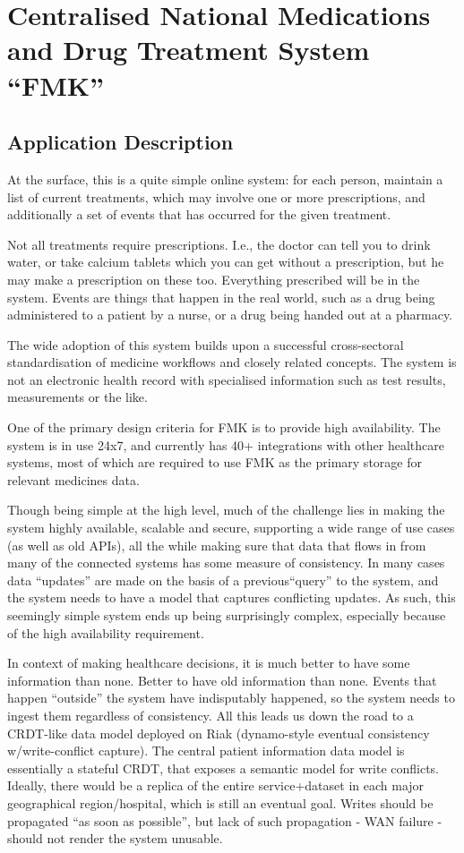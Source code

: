 \documentclass[11pt,a4paper]{report}
\begin{document}
\section{Centralised National Medications and Drug Treatment System ``FMK''}
\subsection{Application Description}
At the surface, this is a quite simple online system: for each person, maintain a list of current treatments, which may involve one or more prescriptions, and additionally a set of events that has occurred for the given treatment. 

Not all treatments require prescriptions. I.e., the doctor can tell you to drink water, or take calcium tablets which you can get without a prescription, but he may make a prescription on these too. Everything prescribed will be in the system. Events are things that happen in the real world, such as a drug being administered to a patient by a nurse, or a drug being handed out at a pharmacy. 

The wide adoption of this system builds upon a successful cross-sectoral standardisation of medicine workflows and closely related concepts. The system is not an electronic health record with specialised information such as test results, measurements or the like.

One of the primary design criteria for FMK is to provide high availability. The system is in use 24x7, and currently has 40+ integrations with other healthcare systems, most of which are required to use FMK as the primary storage for relevant medicines data.

Though being simple at the high level, much of the challenge lies in making the system highly available, scalable and secure, supporting a wide range of use cases (as well as old APIs), all the while making sure that data that flows in from many of the connected systems has some measure of consistency. In many cases data ``updates'' are made on the basis of a previous``query'' to the system, and the system needs to have a model that captures conflicting updates. As such, this seemingly simple system ends up being surprisingly complex, especially because of the high availability requirement.

In context of making healthcare decisions, it is much better to have some information than none. Better to have old information than none. Events that happen ``outside'' the system have indisputably happened, so the system needs to ingest them regardless of consistency.
All this leads us down the road to a CRDT-like data model deployed on Riak (dynamo-style eventual consistency w/write-conflict capture). The central patient information data model is essentially a stateful CRDT, that exposes a semantic model for write conflicts. Ideally, there would be a replica of the entire service+dataset in each major geographical region/hospital, which is still an eventual goal. Writes should be propagated ``as soon as possible'', but lack of such propagation - WAN failure - should not render the system unusable.
\end{document}
